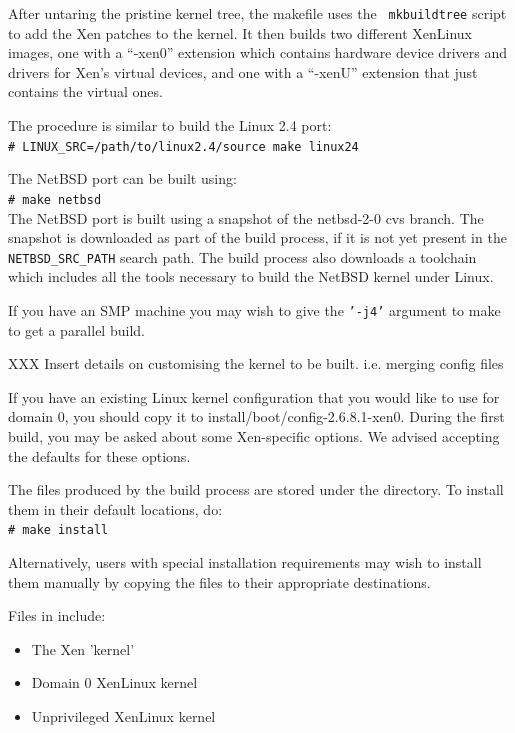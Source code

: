 \documentclass[11pt,twoside,final,openright]{xenstyle}
\begin{document}
After untaring the pristine kernel tree, the makefile uses the {\tt
mkbuildtree} script to add the Xen patches to the kernel.  It then
builds two different XenLinux images, one with a ``-xen0'' extension
which contains hardware device drivers and drivers for Xen's virtual
devices, and one with a ``-xenU'' extension that just contains the
virtual ones.

The procedure is similar to build the Linux 2.4 port: \\
\verb!# LINUX_SRC=/path/to/linux2.4/source make linux24!

The NetBSD port can be built using: \\ \verb!# make netbsd! \\ The
NetBSD port is built using a snapshot of the netbsd-2-0 cvs branch.
The snapshot is downloaded as part of the build process, if it is not
yet present in the {\tt NETBSD\_SRC\_PATH} search path.  The build
process also downloads a toolchain which includes all the tools
necessary to build the NetBSD kernel under Linux.

If you have an SMP machine you may wish to give the {\tt '-j4'}
argument to make to get a parallel build.

XXX Insert details on customising the kernel to be built.
i.e. merging config files

If you have an existing Linux kernel configuration that you would like
to use for domain 0, you should copy it to
install/boot/config-2.6.8.1-xen0.  During the first build, you may be
asked about some Xen-specific options.  We advised accepting the
defaults for these options.


The files produced by the build process are stored under the
 directory.  To install them in their default
locations, do: \\
\verb_# make install_

Alternatively, users with special installation requirements may wish
to install them manually by copying the files to their appropriate
destinations.

Files in  include:
\begin{itemize}
\item {} The Xen 'kernel'
\item {}  Domain 0 XenLinux kernel
\item {}  Unprivileged XenLinux kernel
\end{itemize}
\end{document}
